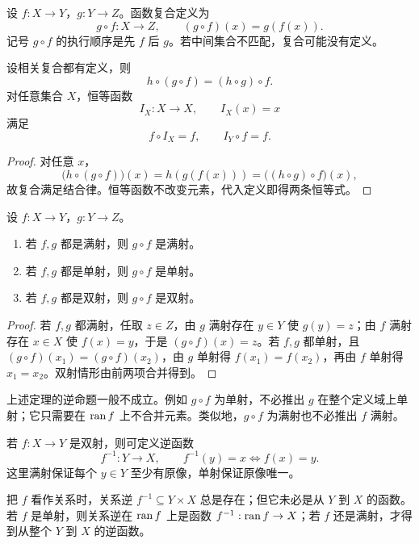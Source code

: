 设 $f:X\to Y$，$g:Y\to Z$。函数复合定义为
\[
g\circ f:X\to Z,\qquad (g\circ f)(x)=g(f(x)).
\]
记号 $g\circ f$ 的执行顺序是先 $f$ 后 $g$。若中间集合不匹配，复合可能没有定义。

\begin{theorem}[复合的基本性质]\label{composition-laws}
  设相关复合都有定义，则
  \[
  h\circ(g\circ f)=(h\circ g)\circ f.
  \]
  对任意集合 $X$，恒等函数
  \[
  I_X:X\to X,\qquad I_X(x)=x
  \]
  满足
  \[
  f\circ I_X=f,\qquad I_Y\circ f=f.
  \]
\end{theorem}

\begin{proof}
  对任意 $x$，
  \[
  \bigl(h\circ(g\circ f)\bigr)(x)=h(g(f(x)))=\bigl((h\circ g)\circ f\bigr)(x),
  \]
  故复合满足结合律。恒等函数不改变元素，代入定义即得两条恒等式。
\end{proof}

\begin{theorem}\label{composition-preserves-types}
  设 $f:X\to Y$，$g:Y\to Z$。
  \begin{enumerate}
    \item 若 $f,g$ 都是满射，则 $g\circ f$ 是满射。
    \item 若 $f,g$ 都是单射，则 $g\circ f$ 是单射。
    \item 若 $f,g$ 都是双射，则 $g\circ f$ 是双射。
  \end{enumerate}
\end{theorem}

\begin{proof}
  若 $f,g$ 都满射，任取 $z\in Z$，由 $g$ 满射存在 $y\in Y$ 使 $g(y)=z$；由 $f$ 满射存在 $x\in X$ 使 $f(x)=y$，于是 $(g\circ f)(x)=z$。若 $f,g$ 都单射，且 $(g\circ f)(x_1)=(g\circ f)(x_2)$，由 $g$ 单射得 $f(x_1)=f(x_2)$，再由 $f$ 单射得 $x_1=x_2$。双射情形由前两项合并得到。
\end{proof}

上述定理的逆命题一般不成立。例如 $g\circ f$ 为单射，不必推出 $g$ 在整个定义域上单射；它只需要在 $\operatorname{ran} f$ 上不合并元素。类似地，$g\circ f$ 为满射也不必推出 $f$ 满射。

若 $f:X\to Y$ 是双射，则可定义逆函数
\[
f^{-1}:Y\to X,\qquad f^{-1}(y)=x\Longleftrightarrow f(x)=y.
\]
这里满射保证每个 $y\in Y$ 至少有原像，单射保证原像唯一。

把 $f$ 看作关系时，关系逆 $f^{-1}\subseteq Y\times X$ 总是存在；但它未必是从 $Y$ 到 $X$ 的函数。若 $f$ 是单射，则关系逆在 $\operatorname{ran} f$ 上是函数 $f^{-1}:\operatorname{ran} f\to X$；若 $f$ 还是满射，才得到从整个 $Y$ 到 $X$ 的逆函数。

